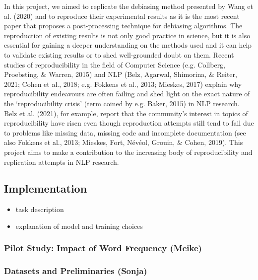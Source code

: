 \documentclass[
  english,
  man,floatsintext]{apa6}
\providecommand{\tightlist}{%
  \setlength{\itemsep}{0pt}\setlength{\parskip}{0pt}}
\begin{document}
In this project, we aimed to replicate the debiasing method presented by Wang et al. (2020) and to reproduce their experimental results as it is the most recent paper that proposes a post-processing technique for debiasing algorithms.
The reproduction of existing results is not only good practice in science, but it is also essential for gaining a deeper understanding on the methods used and it can help to validate existing results or to shed well-grounded doubt on them. Recent studies of reproducibility in the field of Computer Science (e.g. Collberg, Proebsting, \& Warren, 2015) and NLP (Belz, Agarwal, Shimorina, \& Reiter, 2021; Cohen et al., 2018; e.g. Fokkens et al., 2013; Mieskes, 2017) explain why reproducibility endeavours are often failing and shed light on the exact nature of the `reproducibility crisis' (term coined by e.g. Baker, 2015) in NLP research. Belz et al. (2021), for example, report that the community's interest in topics of reproducibility have risen even though reproduction attempts still tend to fail due to problems like missing data, missing code and incomplete documentation (see also Fokkens et al., 2013; Mieskes, Fort, Névéol, Grouin, \& Cohen, 2019).
This project aims to make a contribution to the increasing body of reproducibility and replication attempts in NLP research.

\hypertarget{implementation}{%
\subsection{Implementation}\label{implementation}}

\begin{itemize}
\tightlist
\item
  task description
\item
  explanation of model and training choices
\end{itemize}

\hypertarget{pilot-study-impact-of-word-frequency-meike}{%
\subsubsection{Pilot Study: Impact of Word Frequency (Meike)}\label{pilot-study-impact-of-word-frequency-meike}}

\hypertarget{datasets-and-preliminaries-sonja}{%
\subsubsection{Datasets and Preliminaries (Sonja)}\label{datasets-and-preliminaries-sonja}}
\end{document}
